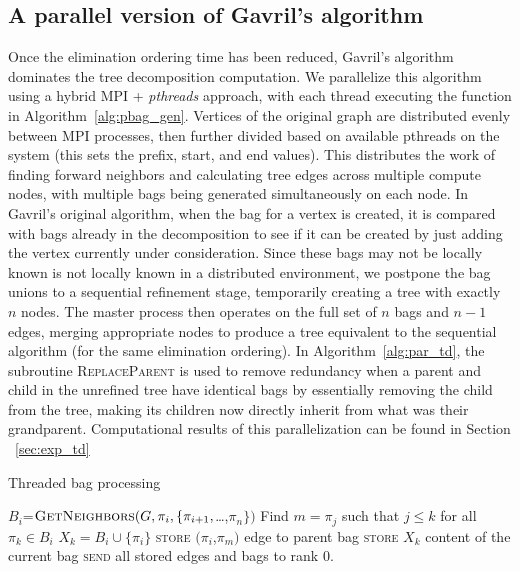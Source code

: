 \documentclass[conference]{IEEEtran}
\begin{document}
\subsection{A parallel version of Gavril's algorithm}
Once the elimination ordering time has been reduced, Gavril's algorithm ~\cite{Gavril1974} %
dominates the tree decomposition computation. We parallelize this algorithm
using a hybrid MPI + \emph{pthreads} approach, with each thread executing the function in Algorithm~\ref{alg:pbag_gen}.
Vertices of the original graph are distributed evenly between MPI processes, then further divided based on 
available pthreads on the system (this sets the prefix, start, and end values).
This distributes the work of finding forward neighbors and calculating tree edges across multiple compute nodes, with multiple bags being generated simultaneously on each node.
In Gavril's original algorithm, when the bag for a vertex is created, it is compared with bags already in the decomposition to see
if it can be created by just adding the vertex currently under consideration. Since these bags may not be locally known
is not locally known in a distributed environment, we postpone the bag unions to
a sequential refinement stage, temporarily creating a tree with exactly $n$ nodes. The master process then operates on the full set of
$n$ bags and $n-1$ edges, merging appropriate nodes to produce a tree equivalent to the sequential
algorithm (for the same elimination ordering). In Algorithm~\ref{alg:par_td},
the subroutine \textsc{ReplaceParent} is used to remove redundancy when a parent and child in the unrefined tree have identical bags by essentially removing the child from the tree, making its children now directly inherit from what was their grandparent. Computational results of this parallelization can be found in Section ~\ref{sec:exp_td}

\begin{algorithm}[ht!]
\caption{Threaded bag processing}
\label{alg:pbag_gen}
\begin{algorithmic}[1]
\State $B_i$=$\text{\textsc{GetNeighbors}}(G,\pi_i,\{\pi_{i+1},${\tiny \ldots},$\pi_n\})$
\State Find $m = \pi_{j}$ such that $j \leq k$ for all $\pi_{k} \in
B_{i}$
\State $X_{k} = B_{i} \cup \{\pi_{i}\}$
\State \textsc{store} $(\pi_{i}$,$\pi_{m})$
\Comment edge to parent bag
\State \textsc{store} $X_{k}$
\Comment content of the current bag
\EndFor
\State \textsc{send} all stored edges and bags to rank 0.
\EndProcedure
\end{algorithmic}
\end{algorithm}
\end{document}
